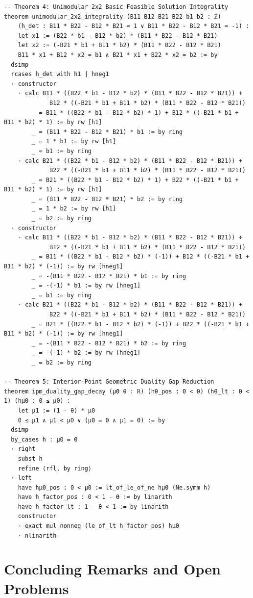 \documentclass[11pt,a4paper]{article}
\theoremstyle{definition}
\begin{document}
\begin{lstlisting}[caption={Formal Lean 4 Verification of LP Duality and Invariants}]
-- Theorem 4: Unimodular 2x2 Basic Feasible Solution Integrality
theorem unimodular_2x2_integrality (B11 B12 B21 B22 b1 b2 : ℤ)
    (h_det : B11 * B22 - B12 * B21 = 1 ∨ B11 * B22 - B12 * B21 = -1) :
    let x1 := (B22 * b1 - B12 * b2) * (B11 * B22 - B12 * B21)
    let x2 := (-B21 * b1 + B11 * b2) * (B11 * B22 - B12 * B21)
    B11 * x1 + B12 * x2 = b1 ∧ B21 * x1 + B22 * x2 = b2 := by
  dsimp
  rcases h_det with h1 | hneg1
  · constructor
    · calc B11 * ((B22 * b1 - B12 * b2) * (B11 * B22 - B12 * B21)) +
             B12 * ((-B21 * b1 + B11 * b2) * (B11 * B22 - B12 * B21))
        _ = B11 * ((B22 * b1 - B12 * b2) * 1) + B12 * ((-B21 * b1 + B11 * b2) * 1) := by rw [h1]
        _ = (B11 * B22 - B12 * B21) * b1 := by ring
        _ = 1 * b1 := by rw [h1]
        _ = b1 := by ring
    · calc B21 * ((B22 * b1 - B12 * b2) * (B11 * B22 - B12 * B21)) +
             B22 * ((-B21 * b1 + B11 * b2) * (B11 * B22 - B12 * B21))
        _ = B21 * ((B22 * b1 - B12 * b2) * 1) + B22 * ((-B21 * b1 + B11 * b2) * 1) := by rw [h1]
        _ = (B11 * B22 - B12 * B21) * b2 := by ring
        _ = 1 * b2 := by rw [h1]
        _ = b2 := by ring
  · constructor
    · calc B11 * ((B22 * b1 - B12 * b2) * (B11 * B22 - B12 * B21)) +
             B12 * ((-B21 * b1 + B11 * b2) * (B11 * B22 - B12 * B21))
        _ = B11 * ((B22 * b1 - B12 * b2) * (-1)) + B12 * ((-B21 * b1 + B11 * b2) * (-1)) := by rw [hneg1]
        _ = -(B11 * B22 - B12 * B21) * b1 := by ring
        _ = -(-1) * b1 := by rw [hneg1]
        _ = b1 := by ring
    · calc B21 * ((B22 * b1 - B12 * b2) * (B11 * B22 - B12 * B21)) +
             B22 * ((-B21 * b1 + B11 * b2) * (B11 * B22 - B12 * B21))
        _ = B21 * ((B22 * b1 - B12 * b2) * (-1)) + B22 * ((-B21 * b1 + B11 * b2) * (-1)) := by rw [hneg1]
        _ = -(B11 * B22 - B12 * B21) * b2 := by ring
        _ = -(-1) * b2 := by rw [hneg1]
        _ = b2 := by ring

-- Theorem 5: Interior-Point Geometric Duality Gap Reduction
theorem ipm_duality_gap_decay (μ0 θ : ℝ) (hθ_pos : 0 < θ) (hθ_lt : θ < 1) (hμ0 : 0 ≤ μ0) :
    let μ1 := (1 - θ) * μ0
    0 ≤ μ1 ∧ μ1 < μ0 ∨ (μ0 = 0 ∧ μ1 = 0) := by
  dsimp
  by_cases h : μ0 = 0
  · right
    subst h
    refine ⟨rfl, by ring⟩
  · left
    have hμ0_pos : 0 < μ0 := lt_of_le_of_ne hμ0 (Ne.symm h)
    have h_factor_pos : 0 < 1 - θ := by linarith
    have h_factor_lt : 1 - θ < 1 := by linarith
    constructor
    · exact mul_nonneg (le_of_lt h_factor_pos) hμ0
    · nlinarith
\end{lstlisting}

\section{Concluding Remarks and Open Problems}
\end{document}
